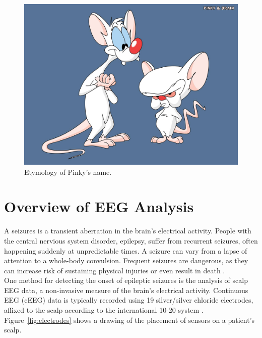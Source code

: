 \begin{figure}[h]
\begin{center}
\includegraphics[scale=0.5]{./img/pinky-and-the-brain.png}
\caption{Etymology of Pinky's name.}
\label{fig:pinky-and-the-brain}
\end{center}
\end{figure}

\section{Overview of EEG Analysis}

A seizures is a transient aberration in the brain's electrical activity. People
with the central nervious system disorder, epilepsy, suffer from recurrent
seizures, often happening suddenly at unpredictable times. A seizure can vary
from a lapse of attention to a whole-body convulsion. Frequent seizures are
dangerous, as they can increase risk of sustaining physical injuries or even
result in death \cite{eeg-ml}. \\

One method for detecting the onset of epileptic seizures is the analysis of
scalp EEG data, a non-invasive measure of the brain's electrical activity.
Continuous EEG (cEEG) data is typically recorded using 19 silver/silver
chloride electrodes, affixed to the scalp according to the international 10-20
system \cite{ceeg-1}. Figure~\ref{fig:electrodes} shows a drawing of the
placement of sensors on a patient's scalp. \\

